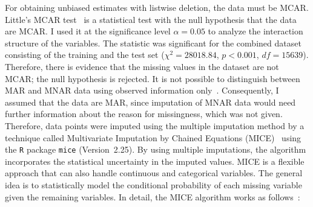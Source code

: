 \documentclass[a4paper]{article}
\begin{document}
For obtaining unbiased estimates with listwise deletion, the data must
be MCAR. Little's MCAR test~\cite{little1988test} is a statistical
test with the null hypothesis that the data are MCAR. I used it at the
significance level $\alpha=0.05$ to analyze the interaction structure
of the variables. The statistic was significant for the combined
dataset consisting of the training and the test set
($\chi^2 = 28018.84$, $p < 0.001$, $df=15639$). Therefore, there is
evidence that the missing values in the dataset are not MCAR; the null
hypothesis is rejected. It is not possible to distinguish between MAR
and MNAR data using observed information
only~\cite{sterne2009multiple}. Consequently, I assumed that the data
are MAR, since imputation of MNAR data would need further information
about the reason for missingness, which was not given.  Therefore,
data points were imputed using the multiple imputation method by a
technique called Multivariate Imputation by Chained Equations
(MICE)~\cite{buuren2011mice} using the \texttt{R} package
\texttt{mice} (Version~2.25). By using multiple imputations, the
algorithm incorporates the statistical uncertainty in the imputed
values. MICE is a flexible approach that can also handle continuous
and categorical variables. The general idea is to statistically model
the conditional probability of each missing variable given the
remaining variables. In detail, the MICE algorithm works as
follows~\cite{buuren2011mice,azur2011multiple}:
\end{document}
